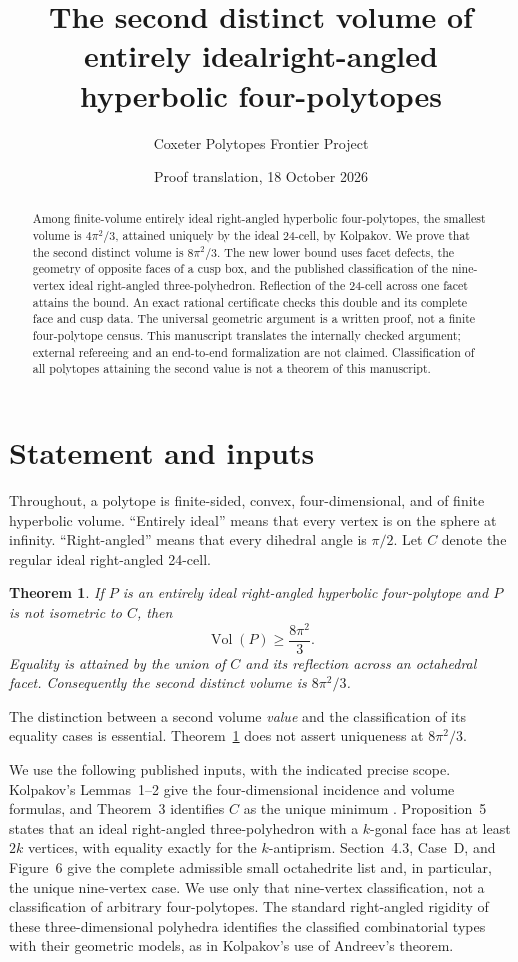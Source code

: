\documentclass[11pt]{article}
\title{The second distinct volume of entirely ideal\linebreak right-angled hyperbolic four-polytopes}
\author{Coxeter Polytopes Frontier Project}
\date{Proof translation, 18 October 2026}
\newtheorem{theorem}{Theorem}[section]
\newcommand{\Vol}{\operatorname{Vol}}
\begin{document}
\maketitle
\begin{abstract}
Among finite-volume entirely ideal right-angled hyperbolic four-polytopes,
the smallest volume is $4\pi^2/3$, attained uniquely by the ideal 24-cell,
by Kolpakov. We prove that the second distinct volume is $8\pi^2/3$.
The new lower bound uses facet defects, the geometry of opposite faces
of a cusp box, and the published classification of the nine-vertex
ideal right-angled three-polyhedron. Reflection of the 24-cell across
one facet attains the bound. An exact rational certificate checks this
double and its complete face and cusp data. The universal geometric
argument is a written proof, not a finite four-polytope census.
This manuscript translates the internally checked argument; external
refereeing and an end-to-end formalization are not claimed.
Classification of all polytopes attaining the second value is not a
theorem of this manuscript.
\end{abstract}

\section{Statement and inputs}
Throughout, a polytope is finite-sided, convex, four-dimensional, and of
finite hyperbolic volume. ``Entirely ideal'' means that every vertex is
on the sphere at infinity. ``Right-angled'' means that every dihedral
angle is $\pi/2$. Let $C$ denote the regular ideal right-angled 24-cell.

\begin{theorem}\label{thm:gap}
If $P$ is an entirely ideal right-angled hyperbolic four-polytope and
$P$ is not isometric to $C$, then
\[
 \Vol(P)\ge \frac{8\pi^2}{3}.
\]
Equality is attained by the union of $C$ and its reflection across an
octahedral facet. Consequently the second distinct volume is
$8\pi^2/3$.
\end{theorem}

The distinction between a second volume \emph{value} and the
classification of its equality cases is essential. Theorem~\ref{thm:gap}
does not assert uniqueness at $8\pi^2/3$.

We use the following published inputs, with the indicated precise scope.
Kolpakov's Lemmas~1--2 give the four-dimensional incidence and volume
formulas, and Theorem~3 identifies $C$ as the unique minimum
\cite{Kolpakov}. Proposition~5 states that an ideal right-angled
three-polyhedron with a $k$-gonal face has at least $2k$ vertices, with
equality exactly for the $k$-antiprism. Section~4.3, Case~D, and Figure~6
give the complete admissible small octahedrite list and, in particular,
the unique nine-vertex case. We use only that nine-vertex classification,
not a classification of arbitrary four-polytopes. The standard
right-angled rigidity of these three-dimensional polyhedra identifies
the classified combinatorial types with their geometric models, as in
Kolpakov's use of Andreev's theorem.
\end{document}

